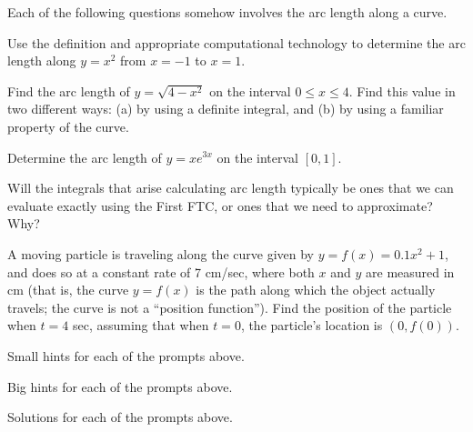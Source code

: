\begin{activity} \label{A:6.3.1}  Each of the following questions somehow involves the arc length along a curve.
\ba
	
	\item Use the definition and appropriate computational technology to determine the arc length along $y = x^2$ from $x = -1$ to $x = 1$.
	\item Find the arc length of $y = \sqrt{4-x^2}$ on the interval $0 \le x \le 4$.  Find this value in two different ways: (a) by using a definite integral, and (b) by using a familiar property of the curve.
	\item Determine the arc length of $y = xe^{3x}$ on the interval $[0,1]$.
	\item Will the integrals that arise calculating arc length typically be ones that we can evaluate exactly using the First FTC, or ones that we need to approximate?  Why?
	\item A moving particle is traveling along the curve given by $y = f(x) = 0.1x^2 + 1$, and does so at a constant rate of 7 cm/sec, where both $x$ and $y$ are measured in cm (that is, the curve $y = f(x)$ is the path along which the object actually travels; the curve is not a ``position function'').  Find the position of the particle when $t = 4$ sec, assuming that when $t = 0$, the particle's location is $(0,f(0))$.
\ea

\end{activity}
\begin{smallhint}
\ba
	\item Small hints for each of the prompts above.
\ea
\end{smallhint}
\begin{bighint}
\ba
	\item Big hints for each of the prompts above.
\ea
\end{bighint}
\begin{activitySolution}
\ba
	\item Solutions for each of the prompts above.
\ea
\end{activitySolution}
\aftera